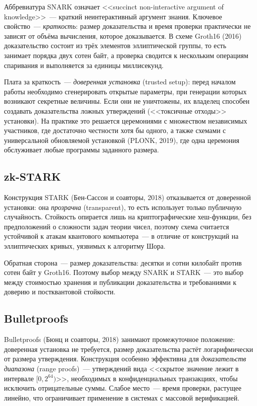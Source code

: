 \documentclass[14pt,a4paper]{extarticle}
\begin{document}
Аббревиатура SNARK означает <<succinct non-interactive argument of knowledge>>~---
краткий неинтерактивный аргумент знания. Ключевое свойство~--- \emph{краткость}: размер
доказательства и время проверки практически не зависят от объёма вычисления, которое
доказывается. В схеме Groth16 (2016) доказательство состоит из трёх элементов
эллиптической группы, то есть занимает порядка двух сотен байт, а проверка сводится к
нескольким операциям спаривания и выполняется за единицы миллисекунд.

Плата за краткость~--- \emph{доверенная установка} (trusted setup): перед началом работы
необходимо сгенерировать открытые параметры, при генерации которых возникают секретные
величины. Если они не уничтожены, их владелец способен создавать доказательства ложных
утверждений (<<токсичные отходы>> установки). На практике это решается церемониями с
множеством независимых участников, где достаточно честности хотя бы одного, а также
схемами с универсальной обновляемой установкой (PLONK, 2019), где одна церемония
обслуживает любые программы заданного размера.

\subsection{zk-STARK}

Конструкция STARK (Бен-Сассон и соавторы, 2018) отказывается от доверенной установки:
она \emph{прозрачна} (transparent), то есть использует только публичную случайность.
Стойкость опирается лишь на криптографические хеш-функции, без предположений о
сложности задач теории чисел, поэтому схема считается устойчивой к атакам квантового
компьютера~--- в отличие от конструкций на эллиптических кривых, уязвимых к алгоритму
Шора.

Обратная сторона~--- размер доказательства: десятки и сотни килобайт против сотен байт
у Groth16. Поэтому выбор между SNARK и STARK~--- это выбор между стоимостью хранения и
публикации доказательства и требованиями к доверию и постквантовой стойкости.

\subsection{Bulletproofs}

Bulletproofs (Бюнц и соавторы, 2018) занимают промежуточное положение: доверенная
установка не требуется, размер доказательства растёт логарифмически от размера
утверждения. Конструкция особенно эффективна для \emph{доказательств диапазона}
(range proofs)~--- утверждений вида <<скрытое значение лежит в интервале
$[0, 2^{64})$>>, необходимых в конфиденциальных транзакциях, чтобы исключить
отрицательные суммы. Слабое место~--- время проверки, растущее линейно, что ограничивает
применение в системах с массовой верификацией.
\end{document}
